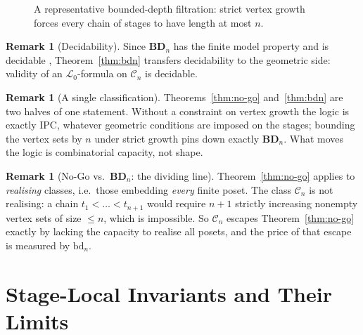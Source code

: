 \documentclass[final,12pt]{elsarticle}
\theoremstyle{plain}
\theoremstyle{definition}
\newtheorem{rem}[thm]{Remark}
\begin{document}
\begin{figure}[htbp]
\centering
{}
\caption{A representative bounded-depth filtration: strict vertex growth forces every chain of stages to have length at most $n$.}
\label{fig:bounded-depth-filtration}
\end{figure}

\begin{rem}[Decidability]
Since \(\mathbf{BD}_n\) has the finite model property and is decidable
\cite{chagrovzakharyaschev1997}, Theorem~\ref{thm:bdn} transfers decidability
to the geometric side: validity of an \(\mathcal{L}_0\)-formula on
\(\mathcal{C}_n\) is decidable.
\end{rem}

\begin{rem}[A single classification]
\label{rem:joint-classification}
Theorems~\ref{thm:no-go} and~\ref{thm:bdn} are two halves of one statement.
Without a constraint on vertex growth the logic is exactly IPC, whatever
geometric conditions are imposed on the stages; bounding the vertex sets by
\(n\) under strict growth pins down exactly \(\mathbf{BD}_n\).  What moves the
logic is combinatorial capacity, not shape.
\end{rem}

\begin{rem}[No-Go vs.\ \texorpdfstring{$\mathbf{BD}_n$}{BDn}: the dividing line]
\label{rem:no-go-vs-bdn}
Theorem~\ref{thm:no-go} applies to \emph{realising} classes, i.e.\ those
embedding \emph{every} finite poset.  The class \(\mathcal{C}_n\) is not
realising: a chain \(t_1<\dots<t_{n+1}\) would require \(n+1\) strictly
increasing nonempty vertex sets of size \(\le n\), which is impossible.  So
\(\mathcal{C}_n\) escapes Theorem~\ref{thm:no-go} exactly by lacking the
capacity to realise all posets, and the price of that escape is measured by
\(\mathrm{bd}_n\).
\end{rem}


\section{Stage-Local Invariants and Their Limits}
\label{sec:neg}
\end{document}
